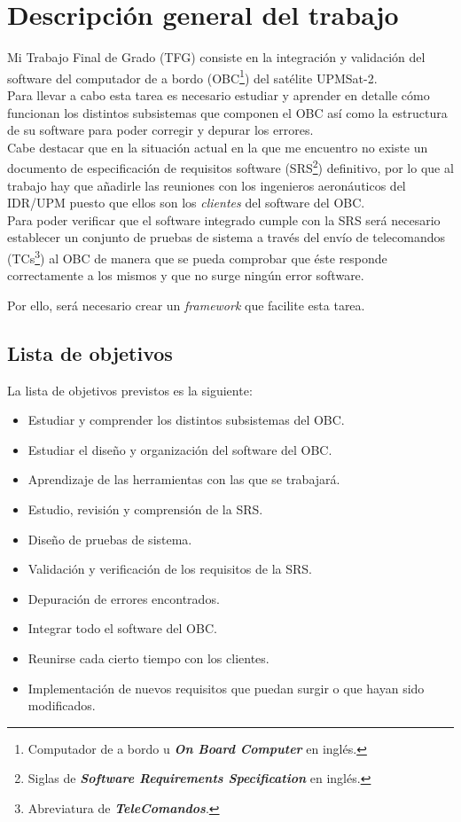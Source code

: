 
\section{Descripción general del trabajo}
Mi Trabajo Final de Grado (TFG) consiste en la integración y validación del
software del computador de a bordo (OBC\footnote{Computador de a bordo u
  \textbf{\textit{On Board Computer}} en inglés.}) del satélite UPMSat-2.\\

  Para llevar a cabo esta tarea es necesario estudiar y aprender en detalle cómo
  funcionan los distintos subsistemas que componen el OBC así como la estructura
  de su software para poder corregir y depurar los errores.\\

  Cabe destacar que en la situación actual en la que me encuentro no existe un
  documento de especificación de requisitos software (SRS\footnote{Siglas de
    \textbf{\textit{Software Requirements Specification}} en inglés.}) definitivo, por lo
  que al trabajo hay que añadirle las reuniones con los ingenieros aeronáuticos
  del IDR/UPM puesto que ellos son los \textit{clientes} del software del OBC.\\

  Para poder verificar que el software integrado cumple con la SRS será
  necesario establecer un conjunto de pruebas de sistema a través del envío
  de telecomandos (TCs\footnote{Abreviatura de \textbf{\textit{TeleComandos}}.}) al OBC de manera que se pueda comprobar que éste
  responde correctamente a los mismos y que no surge ningún error software.

  Por ello, será necesario crear un \textit{framework} que facilite esta tarea.\\

  \subsection{Lista de objetivos}
  La lista de objetivos previstos es la siguiente:
  \begin{itemize}
    \itemsep0em
  \item Estudiar y comprender los distintos subsistemas del OBC.
  \item Estudiar el diseño y organización del software del OBC.
  \item Aprendizaje de las herramientas con las que se trabajará.
  \item Estudio, revisión y comprensión de la SRS.
  \item Diseño de pruebas de sistema.
  \item Validación y verificación de los requisitos de la SRS.
  \item Depuración de errores encontrados.
  \item Integrar todo el software del OBC.
  \item Reunirse cada cierto tiempo con los clientes.
  \item Implementación de nuevos requisitos que puedan surgir o que hayan sido
    modificados.
  \end{itemize}